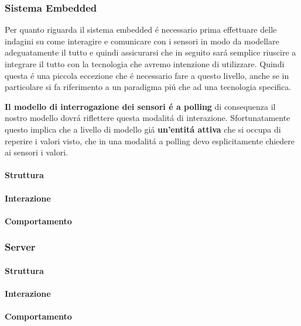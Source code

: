 \subsubsection{Sistema Embedded}

Per quanto riguarda il sistema embedded \'e necessario prima effettuare delle indagini su come interagire e comunicare con i sensori in modo da modellare adeguatamente il tutto e quindi assicurarsi che in seguito sar\'a semplice riuscire a integrare il tutto con la tecnologia che avremo intenzione di utilizzare. Quindi questa \'e una piccola eccezione che \'e necessario fare a questo livello, anche se in particolare si fa riferimento a un paradigma pi\'u che ad una tecnologia specifica.

\textbf{Il modello di interrogazione dei sensori \'e a polling} di consequenza il nostro modello dovr\'a riflettere questa modalit\'a di interazione. Sfortunatamente questo implica che a livello di modello gi\'a \textbf{un'entit\'a attiva} che si occupa di reperire i valori visto, che in una modalit\'a a polling devo esplicitamente chiedere ai sensori i valori.

\paragraph{Struttura}

\paragraph{Interazione}

\paragraph{Comportamento}

\subsubsection{Server}

\paragraph{Struttura}

\paragraph{Interazione}

\paragraph{Comportamento}

